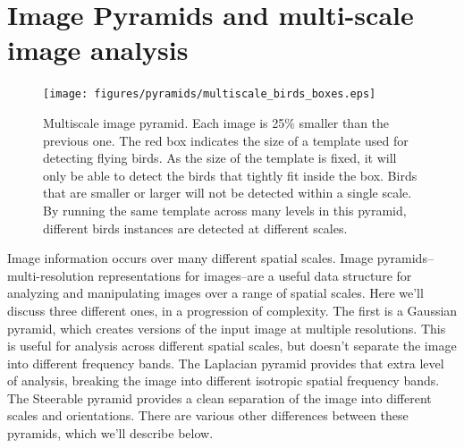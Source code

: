\section{Image Pyramids and multi-scale image analysis}

\begin{figure}
	\centerline{
		\texttt{[image: figures/pyramids/multiscale\_birds\_boxes.eps]}
	}
	\caption{Multiscale image pyramid. Each image is 25$\%$ smaller than the previous one. The red box indicates the size of a template used for detecting flying birds. As the size of the template is fixed, it will only be able to detect the birds that tightly fit inside the box. Birds that are smaller or larger will not be detected within a single scale. By running the same template across many levels in this pyramid, different birds instances are detected at different scales.}
	\label{fig:birds_multiscale_processing}
\end{figure}


Image information occurs over many different spatial scales.
Image pyramids--multi-resolution representations for images--are a
useful data structure for analyzing and manipulating images over a
range of spatial scales.  Here we'll discuss three different ones, in a
progression of complexity. The first is a Gaussian pyramid, which creates versions of the input
image at multiple resolutions.  This is useful for analysis across
different spatial scales, but doesn't separate the image into
different frequency bands.  The Laplacian pyramid provides that extra
level of analysis, breaking the image into different isotropic spatial
frequency bands.
The
Steerable pyramid provides a clean separation of the image into
different scales and orientations.  There are various other
differences between these pyramids, which we'll describe below.


